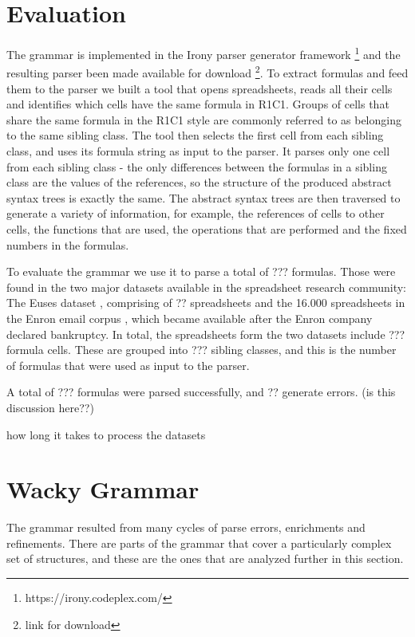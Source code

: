 \documentclass[conference]{IEEEtran}
\begin{document}
\section{Evaluation}
The grammar is implemented in the Irony parser generator framework \footnote{https://irony.codeplex.com/} and the resulting parser been made available for download \footnote{link for download}. To extract formulas and feed them to the parser we built a tool that opens spreadsheets, reads all their cells and identifies which cells have the same formula in R1C1. Groups of cells that share the same formula in the R1C1 style are commonly referred to as belonging to the same sibling class. The tool then selects the first cell from each sibling class, and uses its formula string as input to the parser. It parses only one cell from each sibling class - the only differences between the formulas in a sibling class are the values of the references, so the structure of the produced abstract syntax trees is exactly the same. The abstract syntax trees are then traversed to generate a variety of information, for example, the references of cells to other cells, the functions that are used, the operations that are performed and the fixed numbers in the formulas.

To evaluate the grammar we use it to parse a total of ??? formulas. Those were found in the two major datasets available in the spreadsheet research community: The Euses dataset \cite{euses}, comprising of ?? spreadsheets and the 16.000 spreadsheets in the Enron email corpus \cite{enron}, which became available after the Enron company declared bankruptcy. In total, the spreadsheets form the two datasets include ??? formula cells. These are grouped into ??? sibling classes, and this is the number of formulas that were used as input to the parser.

A total of ??? formulas were parsed successfully, and ?? generate errors. (is this discussion here??)

how long it takes to process the datasets

\section{Wacky Grammar}
The grammar resulted from many cycles of parse errors, enrichments and refinements. There are parts of the grammar that cover a particularly complex set of structures, and these are the ones that are analyzed further in this section.
\end{document}
